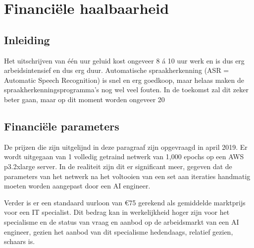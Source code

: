 \chapter{Financiële haalbaarheid}

\begin{center}
  \begin{minipage}{0.5\textwidth}
    \begin{small}
    \end{small}
  \end{minipage}
  \vspace{0.5cm}
\end{center}

\section{Inleiding}

Het uitschrijven van één uur geluid kost ongeveer 8 á 10 uur werk en is dus erg arbeidsintensief en dus erg duur. Automatische spraakherkenning (ASR = Automatic Speech Recognition) is snel en erg goedkoop, maar helaas maken de spraakherkenningsprogramma’s nog wel veel fouten. In de toekomst zal dit zeker beter gaan, maar op dit moment worden ongeveer 20%

\section{Financiële parameters}
De prijzen die zijn uitgelijnd in deze paragraaf zijn opgevraagd in april 2019. Er wordt uitgegaan van 1 volledig getraind netwerk van 1,000 epochs op een AWS p3.2xlarge server. In de realiteit zijn dit er significant meer, gegeven dat de parameters van het netwerk na het voltooien van een set aan iteraties handmatig moeten worden aangepast door een AI engineer.

Verder is er een standaard uurloon van €75 gerekend als gemiddelde marktprijs voor een IT specialist. Dit bedrag kan in werkelijkheid hoger zijn voor het specialisme en de status van vraag en aanbod op de arbeidsmarkt van een AI engineer, gezien het aanbod van dit specialisme hedendaags, relatief gezien, schaars is.

